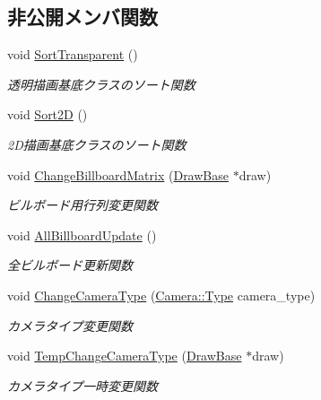 \subsection*{非公開メンバ関数}
\begin{DoxyCompactItemize}
\item 
void \mbox{\hyperlink{class_render_target_main_a6d9b90e599744813fc013551eee5bfc0}{Sort\+Transparent}} ()
\begin{DoxyCompactList}\small\item\em 透明描画基底クラスのソート関数 \end{DoxyCompactList}\item 
void \mbox{\hyperlink{class_render_target_main_a8a69114ba02941a5da78630c29417b8e}{Sort2D}} ()
\begin{DoxyCompactList}\small\item\em 2\+D描画基底クラスのソート関数 \end{DoxyCompactList}\item 
void \mbox{\hyperlink{class_render_target_main_aa66eba70da8da7aa85af79b266212f0a}{Change\+Billboard\+Matrix}} (\mbox{\hyperlink{class_draw_base}{Draw\+Base}} $\ast$draw)
\begin{DoxyCompactList}\small\item\em ビルボード用行列変更関数 \end{DoxyCompactList}\item 
void \mbox{\hyperlink{class_render_target_main_af59ffe67a2ccc4dc1c280362e2473d9b}{All\+Billboard\+Update}} ()
\begin{DoxyCompactList}\small\item\em 全ビルボード更新関数 \end{DoxyCompactList}\item 
void \mbox{\hyperlink{class_render_target_main_acc7030fab799fcd435ef37317d2b8ea0}{Change\+Camera\+Type}} (\mbox{\hyperlink{class_camera_a3b0a1f58deca679ac665f61c480d1dcb}{Camera\+::\+Type}} camera\+\_\+type)
\begin{DoxyCompactList}\small\item\em カメラタイプ変更関数 \end{DoxyCompactList}\item 
void \mbox{\hyperlink{class_render_target_main_a8f267db7731eac84b1a88d502d4c192d}{Temp\+Change\+Camera\+Type}} (\mbox{\hyperlink{class_draw_base}{Draw\+Base}} $\ast$draw)
\begin{DoxyCompactList}\small\item\em カメラタイプ一時変更関数 \end{DoxyCompactList}\item 

\end{DoxyCompactItemize}
